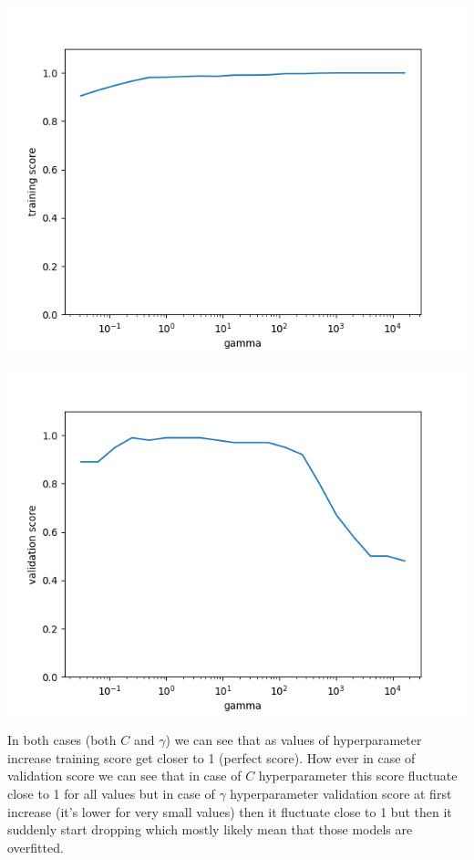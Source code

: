 \documentclass[a4paper]{article}
\begin{document}
	\centerline{\includegraphics[width=1\textwidth]{dataset_1_train_gamma_scores}}  
	
	\centerline{\includegraphics[width=1\textwidth]{dataset_1_validation_gamma_scores}}  
	
	In both cases (both $C$ and $\gamma$) we can see that as values of hyperparameter increase training score get closer to 1 (perfect score). How ever in case of validation score we can see that in case of $C$ hyperparameter this score fluctuate close to 1 for all values but in case of $\gamma$ hyperparameter validation score at first increase (it's lower for very small values) then it fluctuate close to 1 but then it suddenly start dropping which mostly likely mean that those models are overfitted.
	
\end{document}

